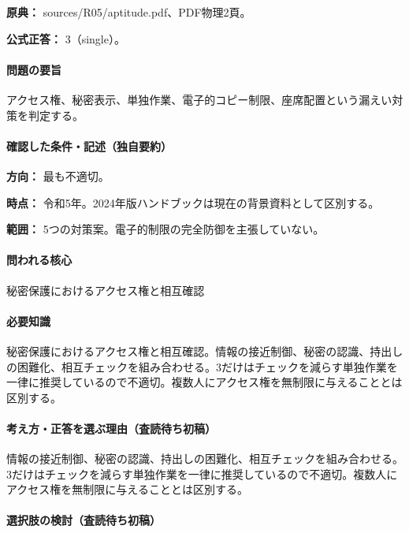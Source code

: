 \noindent\textbf{原典：} sources/R05/aptitude.pdf、PDF物理2頁。

\textbf{公式正答：} 3（single）。

\paragraph{問題の要旨} アクセス権、秘密表示、単独作業、電子的コピー制限、座席配置という漏えい対策を判定する。

\paragraph{確認した条件・記述（独自要約）}\mbox{}\par

\noindent\textbf{方向：} 最も不適切。\par

\noindent\textbf{時点：} 令和5年。2024年版ハンドブックは現在の背景資料として区別する。\par

\noindent\textbf{範囲：} 5つの対策案。電子的制限の完全防御を主張していない。\par

\paragraph{問われる核心} 秘密保護におけるアクセス権と相互確認

\paragraph{必要知識} 秘密保護におけるアクセス権と相互確認。情報の接近制御、秘密の認識、持出しの困難化、相互チェックを組み合わせる。3だけはチェックを減らす単独作業を一律に推奨しているので不適切。複数人にアクセス権を無制限に与えることとは区別する。

\paragraph{考え方・正答を選ぶ理由（査読待ち初稿）} 情報の接近制御、秘密の認識、持出しの困難化、相互チェックを組み合わせる。3だけはチェックを減らす単独作業を一律に推奨しているので不適切。複数人にアクセス権を無制限に与えることとは区別する。

\paragraph{選択肢の検討（査読待ち初稿）}\mbox{}\par

